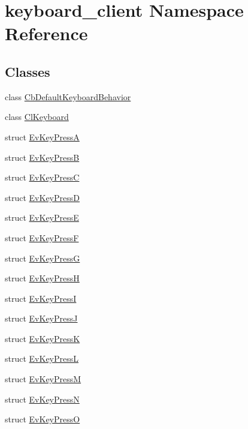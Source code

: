 \hypertarget{namespacekeyboard__client}{}\section{keyboard\+\_\+client Namespace Reference}
\label{namespacekeyboard__client}
\subsection*{Classes}
\begin{DoxyCompactItemize}
\item 
class \hyperlink{classkeyboard__client_1_1CbDefaultKeyboardBehavior}{Cb\+Default\+Keyboard\+Behavior}
\item 
class \hyperlink{classkeyboard__client_1_1ClKeyboard}{Cl\+Keyboard}
\item 
struct \hyperlink{structkeyboard__client_1_1EvKeyPressA}{Ev\+Key\+PressA}
\item 
struct \hyperlink{structkeyboard__client_1_1EvKeyPressB}{Ev\+Key\+PressB}
\item 
struct \hyperlink{structkeyboard__client_1_1EvKeyPressC}{Ev\+Key\+PressC}
\item 
struct \hyperlink{structkeyboard__client_1_1EvKeyPressD}{Ev\+Key\+PressD}
\item 
struct \hyperlink{structkeyboard__client_1_1EvKeyPressE}{Ev\+Key\+PressE}
\item 
struct \hyperlink{structkeyboard__client_1_1EvKeyPressF}{Ev\+Key\+PressF}
\item 
struct \hyperlink{structkeyboard__client_1_1EvKeyPressG}{Ev\+Key\+PressG}
\item 
struct \hyperlink{structkeyboard__client_1_1EvKeyPressH}{Ev\+Key\+PressH}
\item 
struct \hyperlink{structkeyboard__client_1_1EvKeyPressI}{Ev\+Key\+PressI}
\item 
struct \hyperlink{structkeyboard__client_1_1EvKeyPressJ}{Ev\+Key\+PressJ}
\item 
struct \hyperlink{structkeyboard__client_1_1EvKeyPressK}{Ev\+Key\+PressK}
\item 
struct \hyperlink{structkeyboard__client_1_1EvKeyPressL}{Ev\+Key\+PressL}
\item 
struct \hyperlink{structkeyboard__client_1_1EvKeyPressM}{Ev\+Key\+PressM}
\item 
struct \hyperlink{structkeyboard__client_1_1EvKeyPressN}{Ev\+Key\+PressN}
\item 
struct \hyperlink{structkeyboard__client_1_1EvKeyPressO}{Ev\+Key\+PressO}

\end{DoxyCompactItemize}
